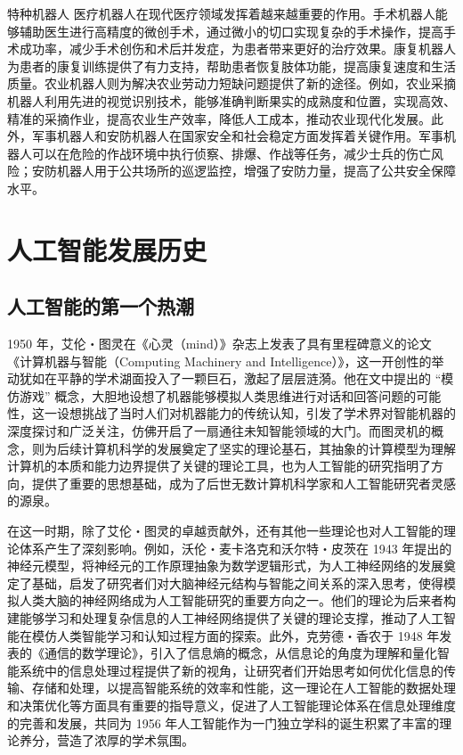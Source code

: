 特种机器人
医疗机器人在现代医疗领域发挥着越来越重要的作用。手术机器人能够辅助医生进行高精度的微创手术，通过微小的切口实现复杂的手术操作，提高手术成功率，减少手术创伤和术后并发症，为患者带来更好的治疗效果。康复机器人为患者的康复训练提供了有力支持，帮助患者恢复肢体功能，提高康复速度和生活质量。农业机器人则为解决农业劳动力短缺问题提供了新的途径。例如，农业采摘机器人利用先进的视觉识别技术，能够准确判断果实的成熟度和位置，实现高效、精准的采摘作业，提高农业生产效率，降低人工成本，推动农业现代化发展。此外，军事机器人和安防机器人在国家安全和社会稳定方面发挥着关键作用。军事机器人可以在危险的作战环境中执行侦察、排爆、作战等任务，减少士兵的伤亡风险；安防机器人用于公共场所的巡逻监控，增强了安防力量，提高了公共安全保障水平。

\section{人工智能发展历史}
\subsection{人工智能的第一个热潮}


1950 年，艾伦・图灵在《心灵（mind）》杂志上发表了具有里程碑意义的论文《计算机器与智能（Computing Machinery and Intelligence）》，这一开创性的举动犹如在平静的学术湖面投入了一颗巨石，激起了层层涟漪。他在文中提出的 “模仿游戏” 概念，大胆地设想了机器能够模拟人类思维进行对话和回答问题的可能性，这一设想挑战了当时人们对机器能力的传统认知，引发了学术界对智能机器的深度探讨和广泛关注，仿佛开启了一扇通往未知智能领域的大门。而图灵机的概念，则为后续计算机科学的发展奠定了坚实的理论基石，其抽象的计算模型为理解计算机的本质和能力边界提供了关键的理论工具，也为人工智能的研究指明了方向，提供了重要的思想基础，成为了后世无数计算机科学家和人工智能研究者灵感的源泉。


在这一时期，除了艾伦・图灵的卓越贡献外，还有其他一些理论也对人工智能的理论体系产生了深刻影响。例如，沃伦・麦卡洛克和沃尔特・皮茨在 1943 年提出的神经元模型，将神经元的工作原理抽象为数学逻辑形式，为人工神经网络的发展奠定了基础，启发了研究者们对大脑神经元结构与智能之间关系的深入思考，使得模拟人类大脑的神经网络成为人工智能研究的重要方向之一。他们的理论为后来者构建能够学习和处理复杂信息的人工神经网络提供了关键的理论支撑，推动了人工智能在模仿人类智能学习和认知过程方面的探索。此外，克劳德・香农于 1948 年发表的《通信的数学理论》，引入了信息熵的概念，从信息论的角度为理解和量化智能系统中的信息处理过程提供了新的视角，让研究者们开始思考如何优化信息的传输、存储和处理，以提高智能系统的效率和性能，这一理论在人工智能的数据处理和决策优化等方面具有重要的指导意义，促进了人工智能理论体系在信息处理维度的完善和发展，共同为 1956 年人工智能作为一门独立学科的诞生积累了丰富的理论养分，营造了浓厚的学术氛围。


